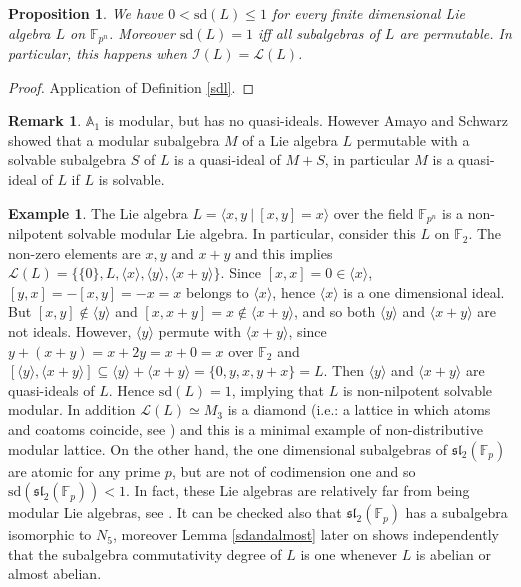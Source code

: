 \documentclass{amsart}
\newtheorem{proposition}[theorem]{Proposition}
\theoremstyle{definition}
\newtheorem{remark}[theorem]{Remark}
\newtheorem{example}[theorem]{Example}
\numberwithin{equation}{section}
\begin{document}
\begin{proposition} We have
 $0<\mathrm{sd}(L)\leq 1$ for every finite dimensional Lie algebra $L$ on $\mathbb{F}_{p^n}$. Moreover $\mathrm{sd}(L) = 1$ iff all subalgebras of $L$ are permutable. In particular, this happens when $\mathcal{I}(L)=\mathcal{L}(L)$. \end{proposition}

 \begin{proof}
 Application of Definition \ref{sdl}.    
 \end{proof}



\begin{remark} $\mathbb{A}_1$ is modular, but has no quasi-ideals. However Amayo and Schwarz \cite{amsc} showed that a modular subalgebra $M$ of a Lie algebra $L$ permutable with a solvable subalgebra $S$ of $L$ is a quasi-ideal of $M + S$,  in particular $M$ is a quasi-ideal of $L$ if $L$ is solvable. \end{remark}

 \begin{example} \label{exam1} The Lie algebra
\(L=\langle x,y\ |\ [x,y]=x\rangle \) over the field \(\mathbb{F}_{p^n}\) is a non-nilpotent solvable modular Lie algebra.  In particular, consider this $L$ on \(\mathbb{F}_{2}\). The non-zero elements are $x,y$ and $x+y$ and this implies $\mathcal{L}(L)=\{ \{0\}, L, \langle x \rangle, \langle y \rangle, \langle x+y \rangle\}.$ Since  \([x,x]=0 \in \langle x\rangle \), $[y,x]=-[x,y]=-x=x $ belongs to $ \langle x\rangle$, hence \(\langle x\rangle \) is a one dimensional ideal.  But \([x,y]\notin \langle y\rangle \) and \([x,x+y]=x \notin \langle x+y\rangle \), and so both \(\langle y\rangle \) and \(\langle x+y\rangle \) are not ideals. However, \(\langle y\rangle \) permute with \(\langle x+y\rangle \), since $y+(x+y)=x+2y=x+0=x$  over $\mathbb{F}_{2}$ and 
\([\langle y\rangle,\langle x+y\rangle]\subseteq \langle y\rangle+\langle x+y\rangle = \{0,y,x,y+x\}=L\). Then $\langle y\rangle$ and $\langle x+y\rangle$ are quasi-ideals of $L$. Hence   $\mathrm{sd}(L)=1$, implying that $L$ is  non-nilpotent solvable modular. In addition  $\mathcal{L}(L)\simeq M_3$ is a diamond (i.e.: a lattice in which atoms and coatoms coincide, see \cite{rs}) and this is a minimal example of  non-distributive modular lattice. On the other hand,  the one dimensional subalgebras  of   $\mathfrak{sl}_2(\mathbb{F}_p)$ are atomic for any prime $p$, but are not of codimension one and so $\mathrm{sd}(\mathfrak{sl}_2(\mathbb{F}_p))<1$.  In fact, these Lie algebras are relatively far from being modular Lie algebras, see \cite{barnes1967, boto, elduque1}.  It can be checked also that   $\mathfrak{sl}_2(\mathbb{F}_p)$ has a subalgebra isomorphic to $N_5$, moreover Lemma \ref{sdandalmost} later on shows independently that the subalgebra commutativity degree of $L$ is one whenever $L$ is abelian or almost abelian.  \end{example}
 
\end{document}
